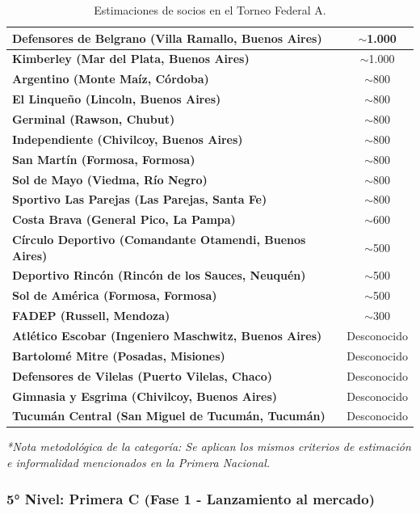 \begin{table}[h!]
\begin{tabularx}{\textwidth}{|X|c|}
\textbf{Defensores de Belgrano (Villa Ramallo, Buenos Aires)} & $\sim$1.000 \\ \hline
\textbf{Kimberley (Mar del Plata, Buenos Aires)} & $\sim$1.000 \\ \hline
\textbf{Argentino (Monte Maíz, Córdoba)} & $\sim$800 \\ \hline
\textbf{El Linqueño (Lincoln, Buenos Aires)} & $\sim$800 \\ \hline
\textbf{Germinal (Rawson, Chubut)} & $\sim$800 \\ \hline
\textbf{Independiente (Chivilcoy, Buenos Aires)} & $\sim$800 \\ \hline
\textbf{San Martín (Formosa, Formosa)} & $\sim$800 \\ \hline
\textbf{Sol de Mayo (Viedma, Río Negro)} & $\sim$800 \\ \hline
\textbf{Sportivo Las Parejas (Las Parejas, Santa Fe)} & $\sim$800 \\ \hline
\textbf{Costa Brava (General Pico, La Pampa)} & $\sim$600 \\ \hline
\textbf{Círculo Deportivo (Comandante Otamendi, Buenos Aires)} & $\sim$500 \\ \hline
\textbf{Deportivo Rincón (Rincón de los Sauces, Neuquén)} & $\sim$500 \\ \hline
\textbf{Sol de América (Formosa, Formosa)} & $\sim$500 \\ \hline
\textbf{FADEP (Russell, Mendoza)} & $\sim$300 \\ \hline
\textbf{Atlético Escobar (Ingeniero Maschwitz, Buenos Aires)} & Desconocido \\ \hline
\textbf{Bartolomé Mitre (Posadas, Misiones)} & Desconocido \\ \hline
\textbf{Defensores de Vilelas (Puerto Vilelas, Chaco)} & Desconocido \\ \hline
\textbf{Gimnasia y Esgrima (Chivilcoy, Buenos Aires)} & Desconocido \\ \hline
\textbf{Tucumán Central (San Miguel de Tucumán, Tucumán)} & Desconocido \\ \hline
\end{tabularx}
\caption{Estimaciones de socios en el Torneo Federal A.}
\label{tab:anexo_federal_a}
\end{table}

\textit{*Nota metodológica de la categoría: Se aplican los mismos criterios de estimación e informalidad mencionados en la Primera Nacional.}

\newpage

\subsubsection{5° Nivel: Primera C (Fase 1 - Lanzamiento al mercado)}

